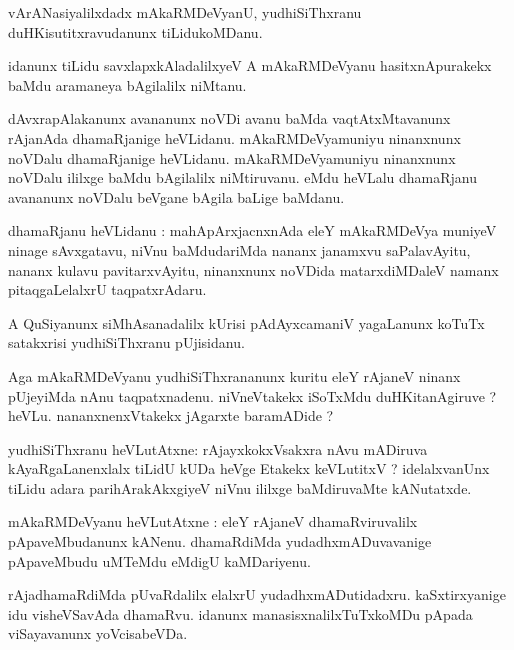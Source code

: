 \documentclass{article}
\begin{document}
\begin{mn}
vArANasiyalilxdadx mAkaRMDeVyanU, yudhiSiThxranu duHKisutitxravudanunx tiLidukoMDanu.
\end{mn}

\begin{mn}
idanunx tiLidu savxlapxkAladalilxyeV A mAkaRMDeVyanu  hasitxnApurakekx baMdu aramaneya bAgilalilx 
niMtanu.
\end{mn}

\begin{mn}
dAvxrapAlakanunx  avananunx noVDi avanu baMda vaqtAtxMtavanunx rAjanAda dhamaRjanige heVLidanu.
mAkaRMDeVyamuniyu ninanxnunx noVDalu dhamaRjanige heVLidanu. mAkaRMDeVyamuniyu ninanxnunx noVDalu 
ililxge baMdu bAgilalilx niMtiruvanu. eMdu heVLalu dhamaRjanu avananunx noVDalu beVgane bAgila 
baLige baMdanu.
\end{mn}

\begin{mn}
dhamaRjanu heVLidanu : mahApArxjacnxnAda eleY mAkaRMDeVya muniyeV ninage sAvxgatavu, niVnu 
baMdudariMda nananx janamxvu saPalavAyitu, nananx kulavu pavitarxvAyitu, ninanxnunx noVDida 
matarxdiMDaleV namanx pitaqgaLelalxrU taqpatxrAdaru.
\end{mn}

\begin{mn}
A QuSiyanunx siMhAsanadalilx kUrisi pAdAyxcamaniV yagaLanunx koTuTx satakxrisi yudhiSiThxranu 
pUjisidanu.
\end{mn}

\begin{mn}
Aga mAkaRMDeVyanu yudhiSiThxrananunx kuritu eleY rAjaneV ninanx pUjeyiMda nAnu taqpatxnadenu. 
niVneVtakekx iSoTxMdu duHKitanAgiruve ? heVLu. nananxnenxVtakekx jAgarxte baramADide ?
\end{mn}

\begin{mn}
yudhiSiThxranu  heVLutAtxne: rAjayxkokxVsakxra nAvu mADiruva kAyaRgaLanenxlalx tiLidU kUDa heVge 
Etakekx keVLutitxV ? idelalxvanUnx tiLidu adara parihArakAkxgiyeV niVnu ililxge baMdiruvaMte 
kANutatxde.
\end{mn}

\begin{mn}
mAkaRMDeVyanu heVLutAtxne : eleY rAjaneV dhamaRviruvalilx pApaveMbudanunx kANenu. dhamaRdiMda 
yudadhxmADuvavanige pApaveMbudu uMTeMdu eMdigU kaMDariyenu.
\end{mn}

\begin{mn}
rAjadhamaRdiMda pUvaRdalilx elalxrU yudadhxmADutidadxru. kaSxtirxyanige idu visheVSavAda dhamaRvu. 
idanunx manasisxnalilxTuTxkoMDu pApada viSayavanunx yoVcisabeVDa.
\end{mn}
\end{document}
